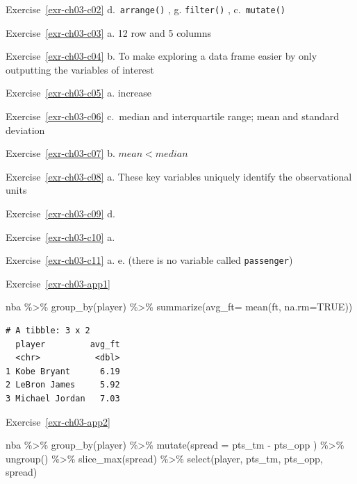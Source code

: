 \documentclass[
  letterpaper,
  DIV=11,
  numbers=noendperiod]{scrreprt}
\newenvironment{Shaded}{\begin{snugshade}}{\end{snugshade}}
\newcommand{\AttributeTok}[1]{\textcolor[rgb]{0.40,0.45,0.13}{#1}}
\newcommand{\ConstantTok}[1]{\textcolor[rgb]{0.56,0.35,0.01}{#1}}
\newcommand{\FunctionTok}[1]{\textcolor[rgb]{0.28,0.35,0.67}{#1}}
\newcommand{\NormalTok}[1]{\textcolor[rgb]{0.00,0.23,0.31}{#1}}
\newcommand{\SpecialCharTok}[1]{\textcolor[rgb]{0.37,0.37,0.37}{#1}}
\theoremstyle{definition}
\theoremstyle{remark}
\begin{document}
Exercise~\ref{exr-ch03-c02} d.~\texttt{arrange()} , g. \texttt{filter()}
, c.~\texttt{mutate()}

Exercise~\ref{exr-ch03-c03} a. 12 row and 5 columns

Exercise~\ref{exr-ch03-c04} b. To make exploring a data frame easier by
only outputting the variables of interest

Exercise~\ref{exr-ch03-c05} a. increase

Exercise~\ref{exr-ch03-c06} c.~median and interquartile range; mean and
standard deviation

Exercise~\ref{exr-ch03-c07} b. \(mean < median\)

Exercise~\ref{exr-ch03-c08} a. These key variables uniquely identify the
observational units

Exercise~\ref{exr-ch03-c09} d.

Exercise~\ref{exr-ch03-c10} a.

Exercise~\ref{exr-ch03-c11} a. e. (there is no variable called
\texttt{passenger})

Exercise~\ref{exr-ch03-app1}

\begin{Shaded}
\begin{Highlighting}[]
\NormalTok{nba }\SpecialCharTok{\%\textgreater{}\%}
  \FunctionTok{group\_by}\NormalTok{(player) }\SpecialCharTok{\%\textgreater{}\%}
  \FunctionTok{summarize}\NormalTok{(}\AttributeTok{avg\_ft=} \FunctionTok{mean}\NormalTok{(ft, }\AttributeTok{na.rm=}\ConstantTok{TRUE}\NormalTok{))}
\end{Highlighting}
\end{Shaded}

\begin{verbatim}
# A tibble: 3 x 2
  player         avg_ft
  <chr>           <dbl>
1 Kobe Bryant      6.19
2 LeBron James     5.92
3 Michael Jordan   7.03
\end{verbatim}

Exercise~\ref{exr-ch03-app2}

\begin{Shaded}
\begin{Highlighting}[]
\NormalTok{nba }\SpecialCharTok{\%\textgreater{}\%}
  \FunctionTok{group\_by}\NormalTok{(player) }\SpecialCharTok{\%\textgreater{}\%}
  \FunctionTok{mutate}\NormalTok{(}\AttributeTok{spread =}\NormalTok{ pts\_tm }\SpecialCharTok{{-}}\NormalTok{ pts\_opp ) }\SpecialCharTok{\%\textgreater{}\%}
  \FunctionTok{ungroup}\NormalTok{() }\SpecialCharTok{\%\textgreater{}\%}
  \FunctionTok{slice\_max}\NormalTok{(spread) }\SpecialCharTok{\%\textgreater{}\%} 
  \FunctionTok{select}\NormalTok{(player, pts\_tm, pts\_opp, spread)}
\end{Highlighting}
\end{Shaded}
\end{document}
